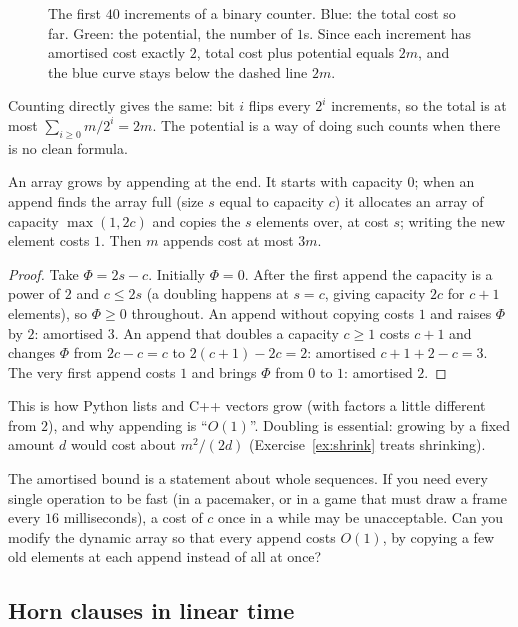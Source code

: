 \begin{figure}[ht]
\centering
{}
\caption{The first $40$ increments of a binary counter. Blue: the total cost so far. Green: the potential, the number of $1$s. Since
each increment has amortised cost exactly $2$, total cost plus potential equals $2m$, and the blue curve stays below the dashed line $2m$.}
\label{fig:potential}
\end{figure}
 Counting directly
gives the same: bit $i$ flips every $2^i$ increments, so the total is at most $\sum_{i\ge0}m/2^i=2m$. The potential is a way of doing such
counts when there is no clean formula.

\begin{proposition}\label{prop:dynarray}
An array grows by appending at the end. It starts with capacity $0$; when an append finds the array full (size $s$ equal to
capacity $c$) it allocates an array of capacity $\max(1,2c)$ and copies the $s$ elements over, at cost $s$; writing the new element
costs $1$. Then $m$ appends cost at most $3m$.
\end{proposition}
\begin{proof}
Take $\Phi=2s-c$. Initially $\Phi=0$. After the first append the capacity is a power of $2$ and $c\le 2s$ (a doubling happens at
$s=c$, giving capacity $2c$ for $c+1$ elements), so $\Phi\ge0$ throughout. An append without copying costs $1$ and raises $\Phi$ by $2$:
amortised $3$. An append that doubles a capacity $c\ge1$ costs $c+1$ and changes $\Phi$ from $2c-c=c$ to $2(c+1)-2c=2$: amortised
$c+1+2-c=3$. The very first append costs $1$ and brings $\Phi$ from $0$ to $1$: amortised $2$.
\end{proof}

This is how Python lists and C++ vectors grow (with factors a little different from $2$), and why appending is ``$O(1)$''. Doubling
is essential: growing by a fixed amount $d$ would cost about $m^2/(2d)$ (Exercise~\ref{ex:shrink} treats shrinking).

\begin{think}
The amortised bound is a statement about whole sequences. If you need every single operation to be fast (in a pacemaker, or
in a game that must draw a frame every $16$ milliseconds), a cost of $c$ once in a while may be unacceptable. Can you modify the dynamic
array so that every append costs $O(1)$, by copying a few old elements at each append instead of all at once?
\end{think}

\subsection*{Horn clauses in linear time}

